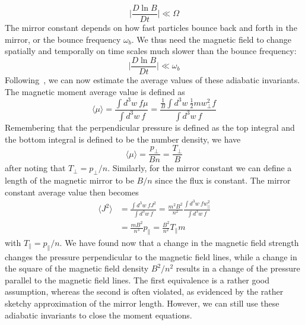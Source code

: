 \begin{equation*}
  \big|\frac{D\ln B}{Dt}\big|\ll\Omega
\end{equation*}
The mirror constant depends on how fast particles bounce back and forth in the mirror, or the bounce frequency $\omega_b$. We thus need the magnetic field to change spatially and temporally on time scales much slower than the bounce frequency:
\begin{equation*}
  \big|\frac{D\ln B}{Dt}\big|\ll\omega_b
\end{equation*}
Following~\citet{KunzBraginskii}, we can now estimate the average values of these adiabatic invariants. The magnetic moment average value is defined as
\begin{equation*}
  \langle\mu\rangle=\frac{\int d^3w~f\mu}{\int d^3w~f}=\frac{\frac1B\int d^3w~\frac12mw_\perp^2f}{\int d^3w~f}
\end{equation*}
Remembering that the perpendicular pressure is defined as the top integral and the bottom integral is defined to be the number density, we have
\begin{equation}
  \langle\mu\rangle=\frac{p_\perp}{Bn}=\frac{T_\perp}{B} \label{eq:muavg}
\end{equation}
after noting that $T_\perp=p_\perp/n$. Similarly, for the mirror constant we can define a length of the magnetic mirror to be $B/n$ since the flux is constant. The mirror constant average value then becomes
\begin{align}
  \langle J^2\rangle&=\frac{\int d^3w~fJ^2}{\int d^3w~f}=\frac{m^2B^2}{n^2}\frac{\int d^3w~fw_\parallel^2}{\int d^3w~f} \nonumber\\
  &=\frac{mB^2}{n^3}p_\parallel=\frac{B^2}{n^2}T_\parallel m\label{eq:javg}
\end{align}
with $T_\parallel=p_\parallel/n$. We have found now that a change in the magnetic field strength changes the pressure perpendicular to the magnetic field lines, while a change in the square of the magnetic field density $B^2/n^2$ results in a change of the pressure parallel to the magnetic field lines. The first equivalence is a rather good assumption, whereas the second is often violated, as evidenced by the rather sketchy approximation of the mirror length. However, we can still use these adiabatic invariants to close the moment equations. 

